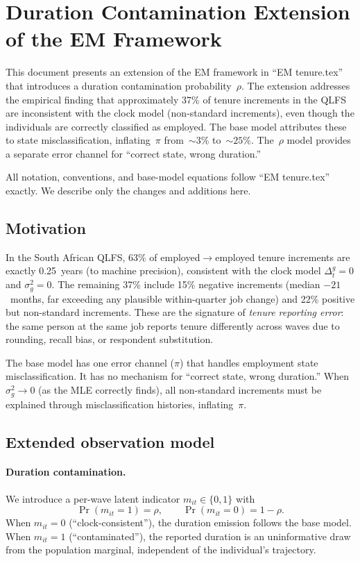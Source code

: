 \documentclass[12pt]{article}
\begin{document}
\section{Duration Contamination Extension of the EM Framework}

This document presents an extension of the EM framework in ``EM tenure.tex'' that introduces a duration contamination probability~\(\rho\). The extension addresses the empirical finding that approximately 37\% of tenure increments in the QLFS are inconsistent with the clock model (non-standard increments), even though the individuals are correctly classified as employed. The base model attributes these to state misclassification, inflating~\(\pi\) from~\(\sim\!3\%\) to~\(\sim\!25\%\). The~\(\rho\) model provides a separate error channel for ``correct state, wrong duration.''

All notation, conventions, and base-model equations follow ``EM tenure.tex'' exactly. We describe only the changes and additions here.

\subsection{Motivation}

In the South African QLFS, 63\% of employed\(\to\)employed tenure increments are exactly 0.25~years (to machine precision), consistent with the clock model \(\Delta^g_t = 0\) and \(\sigma^2_g = 0\). The remaining 37\% include 15\% negative increments (median \(-21\)~months, far exceeding any plausible within-quarter job change) and 22\% positive but non-standard increments. These are the signature of \emph{tenure reporting error}: the same person at the same job reports tenure differently across waves due to rounding, recall bias, or respondent substitution.

The base model has one error channel (\(\pi\)) that handles employment state misclassification. It has no mechanism for ``correct state, wrong duration.'' When \(\sigma^2_g \to 0\) (as the MLE correctly finds), all non-standard increments must be explained through misclassification histories, inflating~\(\pi\).

\subsection{Extended observation model}

\paragraph{Duration contamination.}
We introduce a per-wave latent indicator \(m_{it} \in \{0,1\}\) with
\[
\Pr(m_{it} = 1) = \rho, \qquad \Pr(m_{it} = 0) = 1 - \rho.
\]
When \(m_{it} = 0\) (``clock-consistent''), the duration emission follows the base model. When \(m_{it} = 1\) (``contaminated''), the reported duration is an uninformative draw from the population marginal, independent of the individual's trajectory.
\end{document}
